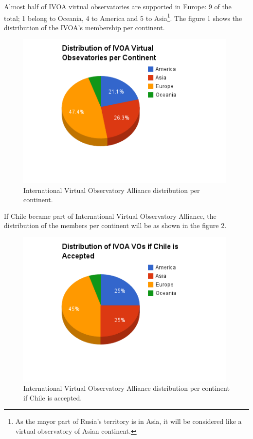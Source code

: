 Almost half of IVOA virtual observatories are supported in Europe: 9 of the
total; 1 belong to Oceania, 4 to America and 5 to Asia\footnote{As the mayor
part of Rusia's territory is in Asia, it will be considered like a virtual
observatory of Asian continent.}. The figure 1 shows the distribution of the
IVOA's membership per continent.\\

\begin{figure}%
\begin{center}
	\includegraphics[width=110mm]{img/vo_distribution.png}
	\caption{International Virtual Observatory Alliance distribution per continent.}
\end{center}
\end{figure}

If Chile became part of International Virtual Observatory Alliance, the
distribution of the members per continent will be as shown in the figure 2.\\

\begin{figure}%
\begin{center}
	\includegraphics[width=110mm]{img/if_chile.png}
	\caption{International Virtual Observatory Alliance distribution per continent if Chile is accepted.}
\end{center}
\end{figure}

